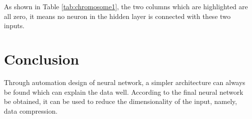 \documentclass[smallextended]{svjour3}       %
\begin{document}
\begin{multicols}{2}
As shown in Table \ref{tab:chromosome1}, the two columns which are highlighted
are all zero, it means no neuron in the hidden layer is connected with these two
inputs.

\section{Conclusion}
Through automation design of neural network, a simpler architecture can always
be found which can explain the data well. According to the final neural network
be obtained, it can be used to reduce the dimensionality of the input, namely,
data compression. 


%

\end{multicols}
\end{document}
